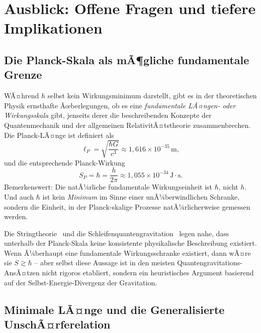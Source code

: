 ﻿\documentclass[12pt,a4paper]{article}
\theoremstyle{plain}
\theoremstyle{definition}
\theoremstyle{remark}
\begin{document}
\section{Ausblick: Offene Fragen und tiefere Implikationen}

\subsection{Die Planck-Skala als mÃ¶gliche fundamentale Grenze}

WÃ¤hrend $h$ selbst kein Wirkungsminimum darstellt, gibt es in der theoretischen Physik
ernsthafte Ãœberlegungen, ob es eine \emph{fundamentale LÃ¤ngen- oder Wirkungsskala} gibt,
jenseits derer die beschreibenden Konzepte der Quantenmechanik und der allgemeinen
RelativitÃ¤tstheorie zusammenbrechen. Die Planck-LÃ¤nge ist definiert als
\begin{equation}
  \ell_P = \sqrt{\frac{\hbar G}{c^3}} \approx 1{,}616\times 10^{-35}\,\text{m},
\end{equation}
und die entsprechende Planck-Wirkung
\begin{equation}
  S_P = \hbar = \frac{h}{2\pi} \approx 1{,}055\times 10^{-34}\,\mathrm{J{\cdot}s}.
\end{equation}
Bemerkenswert: Die natÃ¼rliche fundamentale Wirkungseinheit ist $\hbar$, nicht $h$. Und
auch $\hbar$ ist kein \emph{Minimum} im Sinne einer unÃ¼berwindlichen Schranke, sondern die
Einheit, in der Planck-skalige Prozesse natÃ¼rlicherweise gemessen werden.

Die Stringtheorie~\cite{polchinski1998} und die Schleifenquantengravitation~\cite{rovelli2004}
legen nahe, dass unterhalb der Planck-Skala keine konsistente physikalische Beschreibung
existiert. Wenn Ã¼berhaupt eine fundamentale Wirkungsschranke existiert, dann wÃ¤re sie
$S \gtrsim \hbar$ -- aber selbst diese Aussage ist in den meisten Quantengravitations-AnsÃ¤tzen
nicht rigoros etabliert, sondern ein heuristisches Argument basierend auf der
Selbst-Energie-Divergenz der Gravitation.

\subsection{Minimale LÃ¤nge und die Generalisierte UnschÃ¤rferelation}
\end{document}

